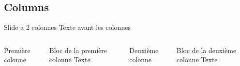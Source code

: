 \documentclass[aspectratio=169]{beamer}
\begin{document}
\subsection{Columns}

\begin{frame}{Slide a 2 colonnes}
    Texte avant les colonnes
    \begin{columns}
            Première colonne
            \begin{block}{Bloc de la première colonne}
                Texte
            \end{block}
            Deuxième colonne
            \begin{block}{Bloc de la deuxième colonne}
                Texte
            \end{block}
    \end{columns}
\end{frame}



\end{document}
